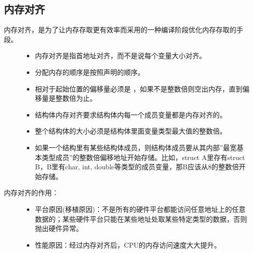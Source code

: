 \documentclass[letterpaper,10pt,english]{sphinxmanual}
\begin{document}
\subsection{内存对齐}
\label{\detokenize{cpp/04_classSize:id11}}\begin{description}
\item[{内存对齐，是为了让内存存取更有效率而采用的一种编译阶段优化内存存取的手段。}] \leavevmode\begin{itemize}
\item {} 
内存对齐是指首地址对齐，而不是说每个变量大小对齐。

\item {} 
分配内存的顺序是按照声明的顺序。

\item {} 
 相对于起始位置的偏移量必须是  ，如果不是整数倍则空出内存，直到偏移量是整数倍为止。

\item {} 
结构体内存对齐要求结构体内每一个成员变量都是内存对齐的。

\item {} 
整个结构体的大小必须是结构体里面变量类型最大值的整数倍。

\item {} 
如果一个结构里有某些结构体成员，则结构体成员要从其内部”最宽基本类型成员”的整数倍偏移地址开始存储。比如，struct A里存有struct B，B里有char, int, double等类型的成员变量，那B应该从8的整数倍开始存储。

\end{itemize}

\item[{内存对齐的作用：}] \leavevmode\begin{itemize}
\item {} 
平台原因(移植原因)：不是所有的硬件平台都能访问任意地址上的任意数据的；某些硬件平台只能在某些地址处取某些特定类型的数据，否则抛出硬件异常。

\item {} 
性能原因：经过内存对齐后，CPU的内存访问速度大大提升。

\end{itemize}

\end{description}
\end{document}
